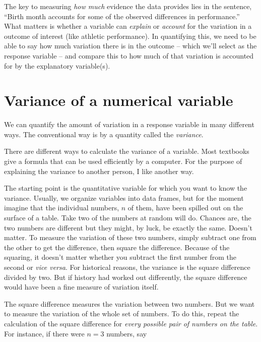 \documentclass[]{book}
\begin{document}
The key to measuring \emph{how much} evidence the data provides lies in the sentence, ``Birth month accounts for some of the observed differences in performance.'' What matters is whether a variable can \emph{explain} or \emph{account} for the variation in a outcome of interest (like athletic performance). In quantifying this, we need to be able to say how much variation there is in the outcome -- which we'll select as the response variable -- and compare this to how much of that variation is accounted for by the explanatory variable(s).

\hypertarget{variance-of-a-numerical-variable}{%
\section{Variance of a numerical variable}\label{variance-of-a-numerical-variable}}

We can quantify the amount of variation in a response variable in many different ways. The conventional way is by a quantity called the \emph{variance}.

There are different ways to calculate the variance of a variable. Most textbooks give a formula that can be used efficiently by a computer. For the purpose of explaining the variance to another person, I like another way.

The starting point is the quantitative variable for which you want to know the variance. Usually, we organize variables into data frames, but for the moment imagine that the individual numbers, \(n\) of them, have been spilled out on the surface of a table. Take two of the numbers at random will do. Chances are, the two numbers are different but they might, by luck, be exactly the same. Doesn't matter. To measure the variation of these two numbers, simply subtract one from the other to get the difference, then square the difference. Because of the squaring, it doesn't matter whether you subtract the first number from the second or \emph{vice versa}. For historical reasons, the variance is the square difference divided by two. But if history had worked out differently, the square difference would have been a fine measure of variation itself.

The square difference measures the variation between two numbers. But we want to measure the variation of the whole set of numbers. To do this, repeat the calculation of the square difference for \emph{every possible pair of numbers on the table}. For instance, if there were \(n=3\) numbers, say
\end{document}
